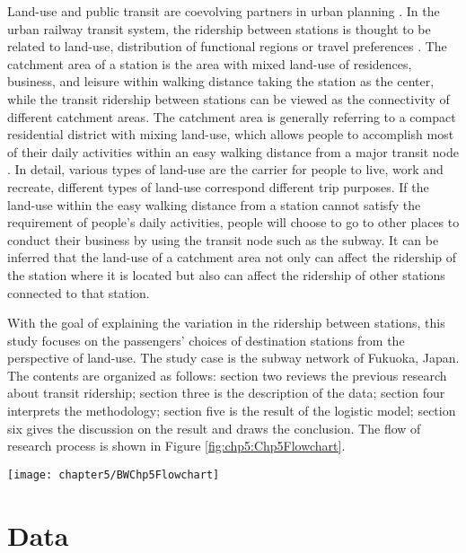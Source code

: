 %
Land-use and public transit are coevolving partners in urban planning \cite{handy2005smart,dittmar2012new}. In the urban railway transit system, the ridership between stations is thought to be related to land-use, distribution of functional regions or travel preferences \cite{thompson1997achieving}. The catchment area of a station is the area with mixed land-use of residences, business, and leisure within walking distance taking the station as the center, while the transit ridership between stations can be viewed as the connectivity of different catchment areas. The catchment area is generally referring to a compact residential district with mixing land-use, which allows people to accomplish most of their daily activities within an easy walking distance from a major transit node \cite{lund2004travel}. In detail, various types of land-use are the carrier for people to live, work and recreate, different types of land-use correspond different trip purposes. If the land-use within the easy walking distance from a station cannot satisfy the requirement of people’s daily activities, people will choose to go to other places to conduct their business by using the transit node such as the subway. It can be inferred that the land-use of a catchment area not only can affect the ridership of the station where it is located but also can affect the ridership of other stations connected to that station.

%
With the goal of explaining the variation in the ridership between stations, this study focuses on the passengers’ choices of destination stations from the perspective of land-use. The study case is the subway network of Fukuoka, Japan. The contents are organized as follows: section two reviews the previous research about transit ridership; section three is the description of the data; section four interprets the methodology; section five is the result of the logistic model; section six gives the discussion on the result and draws the conclusion. The flow of research process is shown in Figure \ref{fig:chp5:Chp5Flowchart}.

\begin{sidewaysfigure}[htbp]
	\centering
	\texttt{[image: chapter5/BWChp5Flowchart]}
	\caption{Research flowchart}
	\label{fig:chp5:Chp5Flowchart}
\end{sidewaysfigure}

%
\section{Data}


